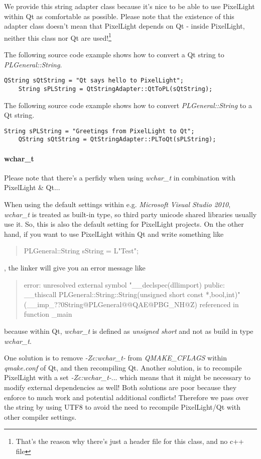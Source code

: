 We provide this string adapter class because it's nice to be able to use PixelLight within Qt as comfortable as possible. Please note that the existence of this adapter class doesn't mean that PixelLight depends on Qt - inside PixelLight, neither this class nor Qt are used!\footnote{That's the reason why there's just a header file for this class, and no c++ file}

The following source code example shows how to convert a Qt string to \emph{PLGeneral::String}.
\begin{lstlisting}[caption=Qt string to PLGeneral::String]
	QString sQtString = "Qt says hello to PixelLight";
	String sPLString = QtStringAdapter::QtToPL(sQtString);
\end{lstlisting}

The following source code example shows how to convert \emph{PLGeneral::String} to a Qt string.
\begin{lstlisting}[caption=PLGeneral::String string to Qt]
	String sPLString = "Greetings from PixelLight to Qt";
	QString sQtString = QtStringAdapter::PLToQt(sPLString);
\end{lstlisting}


\paragraph{wchar\_t}
Please note that there's a perfidy when using \emph{wchar\_t} in combination with PixelLight \& Qt...

When using the default settings within e.g. \emph{Microsoft Visual Studio 2010}, \emph{wchar\_t} is treated as built-in type, so third party unicode shared libraries usually use it. So, this is also the default setting for PixelLight projects. On the other hand, if you want to use PixelLight within Qt and write something like \begin{quote}PLGeneral::String sString = L"Test";\end{quote}, the linker will give you an error message like \begin{quote}error:  unresolved external symbol "\_\_declspec(dllimport) public: \_\_thiscall PLGeneral::String::String(unsigned short const *,bool,int)" (\_\_imp\_??0String@PLGeneral@@QAE@PBG\_NH@Z) referenced in function \_main\end{quote} because within Qt, \emph{wchar\_t} is defined as \emph{unsigned short} and not as build in type \emph{wchar\_t}.

One solution is to remove \emph{-Zc:wchar\_t-} from \emph{QMAKE\_CFLAGS} within \emph{qmake.conf} of Qt, and then recompiling Qt. Another solution,  is to recompile PixelLight with a set \emph{-Zc:wchar\_t-}... which means that it might be necessary to modify external dependencies as well! Both solutions are poor because they enforce to much work and potential additional conflicts! Therefore we pass over the string by using UTF8 to avoid the need to recompile PixelLight/Qt with other compiler settings.
